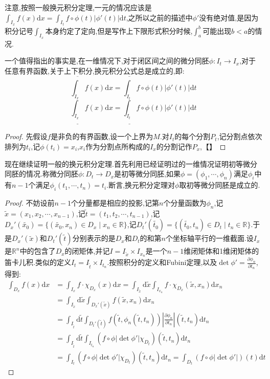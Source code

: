 注意,按照一般换元积分定理,一元的情况应该是$\int_{I_x}f(x)\mathrm{d}x=\int_{I_t}f\circ\phi(t)|\phi'(t)|\mathrm{d}t$,之所以之前的描述中$\phi'$没有绝对值,是因为积分记号$\int_{I_x}$本身约定了定向,但是写作上下限形式积分时候,$\int_a^b$可能出现$b<a$的情况.

一个值得指出的事实是,在一维情况下,对于闭区间之间的微分同胚$\phi:I_t\to I_x$,对于任意有界函数,关于上下积分,换元积分公式总是成立的,即:
$$\overline{\int_{I_x}}f(x)\mathrm{d}x=\overline{\int_{I_t}}f\circ\phi(t)|\phi'(t)|\mathrm{d}t$$
$$\underline{\int_{I_x}}f(x)\mathrm{d}x=\underline{\int_{I_t}}f\circ\phi(t)|\phi'(t)|\mathrm{d}t$$
\begin{proof}
	
	先假设$f$是非负的有界函数,设一个上界为$M$.对$I_t$的每个分割$P_t$,记分割点依次排列为$t_i$,记$\phi(t_i)=x_i$,$x_i$作为分割点所构成的$I_x$的分割记作$P_x$,【】
	
\end{proof}

现在继续证明一般的换元积分定理.首先利用已经证明过的一维情况证明初等微分同胚的情况.称微分同胚$\phi:D_t\to D_x$是初等微分同胚,如果$\phi=(\phi_1,\cdots,\phi_n)$满足$\phi_i$中有$n-1$个满足$\phi_i(t_1,\cdots,t_n)=t_i$.断言,换元积分定理对$\phi$取初等微分同胚是成立的.
\begin{proof}
	
	不妨设前$n-1$个分量都是相应的投影,记第$n$个分量函数为$\phi_n$,记$\widetilde{x}=(x_1,x_2,\cdots,x_{n-1})$,记$\widetilde{t}=(t_1,t_2,\cdots,t_{n-1})$,记$D_x'(\widetilde{x_0})=\{(\widetilde{x_0},x_n)\in D_x\mid x_n\in\mathbb{R}\}$,记$D_t'(\widetilde{t_0})=\{(\widetilde{t_0},t_n)\in D_t\mid t_n\in\mathbb{R}\}$.于是$D_x'(\widetilde{x})$和$D_t'(\widetilde{t})$分别表示的是$D_x$和$D_t$的和第$n$个坐标轴平行的一维截面.设$I_x$是$\mathbb{R}^n$中的包含了$D_x$的闭矩体,并记$I=I_{\widetilde{x}}\times I_{x_n}$是一个$n-1$维闭矩体和1维闭矩体的笛卡儿积.类似的定义$I_t=I_{\widetilde{t}}\times I_{t_n}$.按照积分的定义和Fubini定理,以及$\det\phi'=\frac{\partial\phi_n}{\partial t_n}$,得到:
	\begin{align*}
	\int_{D_x}f(x)\mathrm{d}x &=\int_{I_x}f\cdot\chi_{D_x}(x)\mathrm{d}x=\int_{I_{\widetilde{x}}}\mathrm{d}\widetilde{x}\int_{I_{x_n}}f\cdot\chi_{D_x}(\widetilde{x},x_n)\mathrm{d}x_n\\
	&=\int_{I_{\widetilde{x}}}\mathrm{d}\widetilde{x}\int_{D_x'(\widetilde{x})}f(\widetilde{x},x_n)\mathrm{d}x_n\\
	&=\int_{I_{\widetilde{t}}}\mathrm{d}\widetilde{t}\int_{D_t'(\widetilde{t})}f(\widetilde{t},\phi_n(\widetilde{t},t_n))\left|\frac{\partial\phi_n}{\partial t_n}\right|(\widetilde{t},t_n)\mathrm{d}t_n \\
	&=\int_{I_{\widetilde{t}}}\mathrm{d}\widetilde{t}\int_{I_{t_n}}\left(f\circ\phi|\det\phi'|\chi_{D_t}\right)(\widetilde{t},t_n)\mathrm{d}t_n\\
	&=\int_{I_t}\left(f\circ\phi|\det\phi'|\chi_{D_t}\right)(\widetilde{t},t_n)\mathrm{d}t_n=\int_{D_t}\left(f\circ\phi|\det\phi'|\right)(t)\mathrm{d}t
	\end{align*}
\end{proof}

